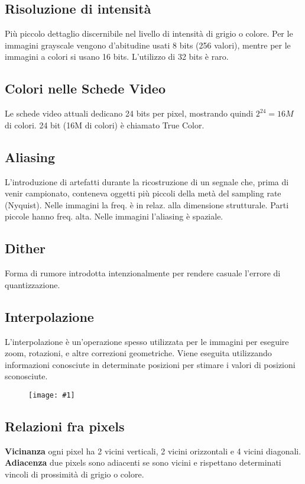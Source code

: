 \documentclass[8pt,a4paper]{article}
\newcommand{\f}[1]{
      \begin{figure}[H]
        \center
      \texttt{[image: \#1]}
      \end{figure}
}
\begin{document}
\begin{multicols}{5}
    \subsection{Risoluzione di intensità}
    Più piccolo dettaglio discernibile nel livello di intensità di grigio o colore.
    Per le immagini grayscale vengono d'abitudine usati 8 bits (256 valori), mentre
    per le immagini a colori si usano 16 bits. L'utilizzo di 32 bits è raro.

    \subsection{Colori nelle Schede Video}
    Le schede video attuali dedicano 24 bits per pixel, mostrando quindi $2^{24} = 16M$
    di colori. 24 bit (16M di colori) è chiamato True Color.

    \subsection{Aliasing}
    L'introduzione di artefatti durante la ricostruzione di un segnale
    che, prima di venir campionato, conteneva oggetti più piccoli della metà
    del sampling rate (Nyquist). Nelle immagini la freq. è in relaz. alla dimensione
    strutturale. Parti piccole hanno freq. alta. Nelle immagini l'aliasing è spaziale.

    \subsection{Dither}
    Forma di rumore introdotta intenzionalmente per rendere casuale l'errore di
    quantizzazione.
    
    \subsection{Interpolazione}
    L’interpolazione è un'operazione spesso utilizzata per le immagini per eseguire 
    zoom, rotazioni, e altre correzioni geometriche. Viene eseguita utilizzando 
    informazioni conosciute in determinate posizioni per stimare i valori di 
    posizioni sconosciute.
    
    \f{interpolation}

    \subsection{Relazioni fra pixels}
    \textbf{Vicinanza} ogni pixel ha 2 vicini verticali, 2 vicini orizzontali e 4 vicini
    diagonali. \\
    \textbf{Adiacenza} due pixels sono adiacenti se sono vicini e rispettano determinati
    vincoli di prossimità di grigio o colore.


\end{multicols}
\end{document}
